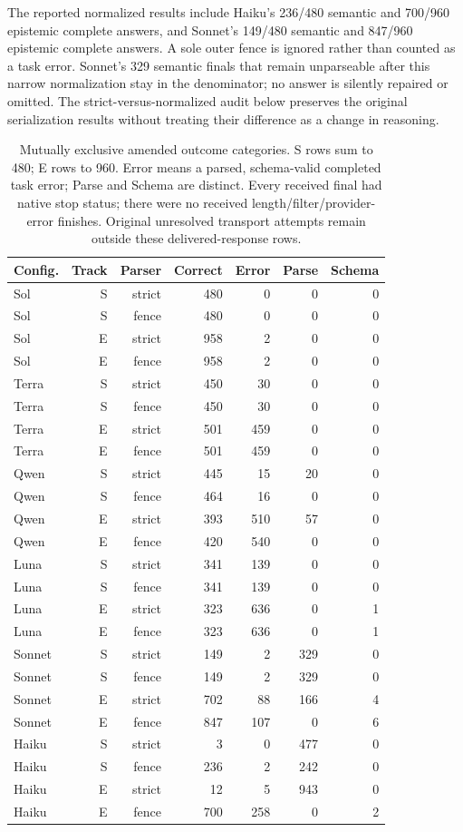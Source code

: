 \documentclass[a4paper,preprint,12pt,numbers,nopreprintline]{elsarticle}
\begin{document}
The reported normalized results include Haiku's 236/480 semantic and 700/960 epistemic complete answers, and Sonnet's 149/480 semantic and 847/960 epistemic complete answers. A sole outer fence is ignored rather than counted as a task error. Sonnet's 329 semantic finals that remain unparseable after this narrow normalization stay in the denominator; no answer is silently repaired or omitted. The strict-versus-normalized audit below preserves the original serialization results without treating their difference as a change in reasoning.
\begin{table}[htbp]\centering\scriptsize
\caption{Mutually exclusive amended outcome categories. S rows sum to 480; E rows to 960. Error means a parsed, schema-valid completed task error; Parse and Schema are distinct. Every received final had native stop status; there were no received length/filter/provider-error finishes. Original unresolved transport attempts remain outside these delivered-response rows.}\label{tab:native-outcomes}
\setlength{\tabcolsep}{3pt}
\begin{tabular}{lrrrrrr}\toprule
Config. & Track & Parser & Correct & Error & Parse & Schema\\\midrule
Sol & S & strict & 480 & 0 & 0 & 0\\
Sol & S & fence & 480 & 0 & 0 & 0\\
Sol & E & strict & 958 & 2 & 0 & 0\\
Sol & E & fence & 958 & 2 & 0 & 0\\
Terra & S & strict & 450 & 30 & 0 & 0\\
Terra & S & fence & 450 & 30 & 0 & 0\\
Terra & E & strict & 501 & 459 & 0 & 0\\
Terra & E & fence & 501 & 459 & 0 & 0\\
Qwen & S & strict & 445 & 15 & 20 & 0\\
Qwen & S & fence & 464 & 16 & 0 & 0\\
Qwen & E & strict & 393 & 510 & 57 & 0\\
Qwen & E & fence & 420 & 540 & 0 & 0\\
Luna & S & strict & 341 & 139 & 0 & 0\\
Luna & S & fence & 341 & 139 & 0 & 0\\
Luna & E & strict & 323 & 636 & 0 & 1\\
Luna & E & fence & 323 & 636 & 0 & 1\\
Sonnet & S & strict & 149 & 2 & 329 & 0\\
Sonnet & S & fence & 149 & 2 & 329 & 0\\
Sonnet & E & strict & 702 & 88 & 166 & 4\\
Sonnet & E & fence & 847 & 107 & 0 & 6\\
Haiku & S & strict & 3 & 0 & 477 & 0\\
Haiku & S & fence & 236 & 2 & 242 & 0\\
Haiku & E & strict & 12 & 5 & 943 & 0\\
Haiku & E & fence & 700 & 258 & 0 & 2\\
\bottomrule\end{tabular}
\end{table}
\end{document}
